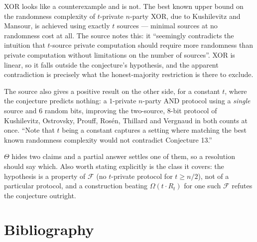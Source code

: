 \documentclass{aicr-conjecture}
\newcommand{\Fn}{\mathcal{F}}
\newcommand{\Rt}{R_{t}}
\begin{document}
\begin{remark}\label{rem:xor}
XOR looks like a counterexample and is not. The best known upper bound on
the randomness complexity of $t$-private $n$-party XOR, due to Kushilevitz
and Mansour, is achieved using exactly $t$ sources --- minimal sources at
no randomness cost at all. The source notes this: it ``seemingly
contradicts the intuition that $t$-source private computation should
require more randomness than private computation without limitations on
the number of sources''. XOR is linear, so it falls outside the
conjecture's hypothesis, and the apparent contradiction is precisely what
the honest-majority restriction is there to exclude.

The source also gives a positive result on the other side, for a constant
$t$, where the conjecture predicts nothing: a $1$-private $n$-party AND
protocol using a \emph{single} source and $6$ random bits, improving
the two-source, $8$-bit protocol of Kushilevitz, Ostrovsky, Prouff,
Ros\'en, Thillard and Vergnaud in both counts at once. ``Note that $t$ being a constant captures a
setting where matching the best known randomness complexity would not
contradict Conjecture 13.''
\end{remark}

\begin{remark}\label{rem:naming}
$\Theta$ hides two claims and a partial answer settles one of them, so a
resolution should say which. Also worth stating explicitly is the class it
covers: the hypothesis is a property of $\Fn$ (no $t$-private protocol for
$t \ge n/2$), not of a particular protocol, and a construction beating
$\Omega(t\cdot\Rt)$ for one such $\Fn$ refutes the conjecture outright.
\end{remark}

\section{Bibliography}
\end{document}

